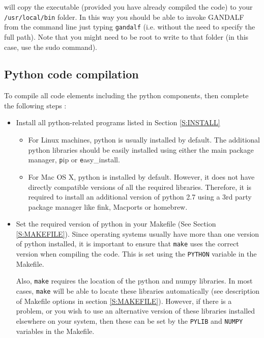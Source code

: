 \documentclass[a4paper]{article}
\newcommand{\var}[1]{\texttt{#1}}
\begin{document}
will copy the executable (provided you have already compiled the code) to your \var{/usr/local/bin} folder. In this way you should be able to invoke GANDALF from the command line just typing \var{gandalf} (i.e. without the need to specify the full path). Note that you might need to be root to write to that folder (in this case, use the sudo command).


\subsection{Python code compilation}
To compile all code elements including the python components, then complete the following steps :
\begin{itemize}

\item Install all python-related programs listed in Section \ref{S:INSTALL}

\begin{itemize}
\item For Linux machines, python is usually installed by default.  The additional python libraries should be easily installed using either the main package manager,  {\var pip} or {\var easy\_install}.
\item For Mac OS X, python is installed by default.  However, it does not have directly compatible versions of all the required libraries.  Therefore, it is required to install an additional version of python 2.7 using a 3rd party package manager like fink, Macports or homebrew.
\end{itemize}

\item Set the required version of python in your Makefile (See Section \ref{S:MAKEFILE}).  Since operating systems usually have more than one version of python installed, it is important to ensure that \var{make} uses the correct version when compiling the code.  This is set using the \var{PYTHON} variable in the Makefile.

Also, \var{make} requires the location of the python and numpy libraries.  In most cases, \var{make} will be able to locate these libraries automatically (see description of Makefile options in section \ref{S:MAKEFILE}).  However, if there is a problem, or you wish to use an alternative version of these libraries installed elsewhere on your system, then these can be set by the \var{PYLIB} and \var{NUMPY} variables in the Makefile.



\end{itemize}
\end{document}
